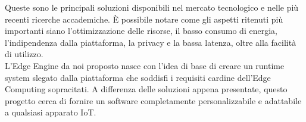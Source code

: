 Queste sono le principali soluzioni disponibili nel mercato tecnologico e nelle più recenti ricerche accademiche. È possibile notare come gli aspetti ritenuti più importanti siano l'ottimizzazione delle risorse, il basso consumo di energia, l'indipendenza dalla piattaforma, la privacy e la bassa latenza, oltre alla facilità di utilizzo.\\ 
L'Edge Engine da noi proposto nasce con l'idea di base di creare un runtime system slegato dalla piattaforma che soddisfi i requisiti cardine dell'Edge Computing sopracitati. A differenza delle soluzioni appena presentate, questo progetto cerca di fornire un software completamente personalizzabile e adattabile a qualsiasi apparato IoT.